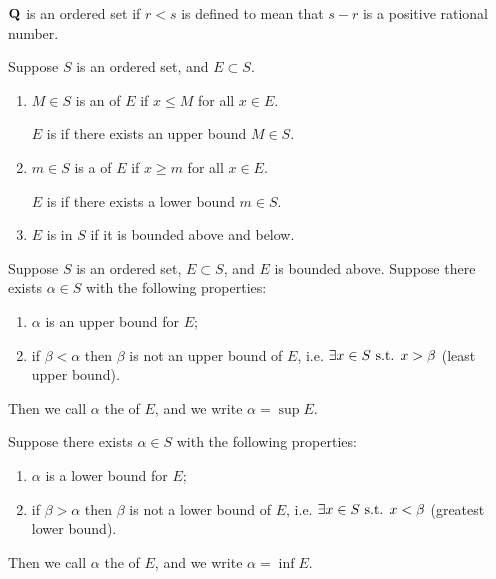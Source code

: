 \begin{example}
$\mathbf Q$ is an ordered set if $r<s$ is defined to mean that $s-r$ is a positive rational number.
\end{example}

\begin{definition}
Suppose $S$ is an ordered set, and $E\subset S$.
\begin{enumerate}[label=(\arabic*)]
\item $M\in S$ is an  of $E$ if $x\le M$ for all $x\in E$.

$E$ is  if there exists an upper bound $M\in S$.

\item $m\in S$ is a  of $E$ if $x\ge m$ for all $x\in E$.

$E$ is  if there exists a lower bound $m\in S$.

\item $E$ is  in $S$ if it is bounded above and below.
\end{enumerate}
\end{definition}

\begin{definition}[Supremum]
Suppose $S$ is an ordered set, $E\subset S$, and $E$ is bounded above. Suppose there exists $\alpha\in S$ with the following properties:
\begin{enumerate}[label=(\roman*)]
\item $\alpha$ is an upper bound for $E$;
\item if $\beta<\alpha$ then $\beta$ is not an upper bound of $E$, i.e. $\exists x\in S\text{ s.t. } x>\beta$ (least upper bound).
\end{enumerate}
Then we call $\alpha$ the  of $E$, and we write $\alpha=\sup E$.
\end{definition}

\begin{definition}[Infimum]
Suppose there exists $\alpha\in S$ with the following properties:
\begin{enumerate}[label=(\roman*)]
\item $\alpha$ is a lower bound for $E$;
\item if $\beta>\alpha$ then $\beta$ is not a lower bound of $E$, i.e. $\exists x\in S\text{ s.t. } x<\beta$ (greatest lower bound).
\end{enumerate}
Then we call $\alpha$ the  of $E$, and we write $\alpha=\inf E$.
\end{definition}


